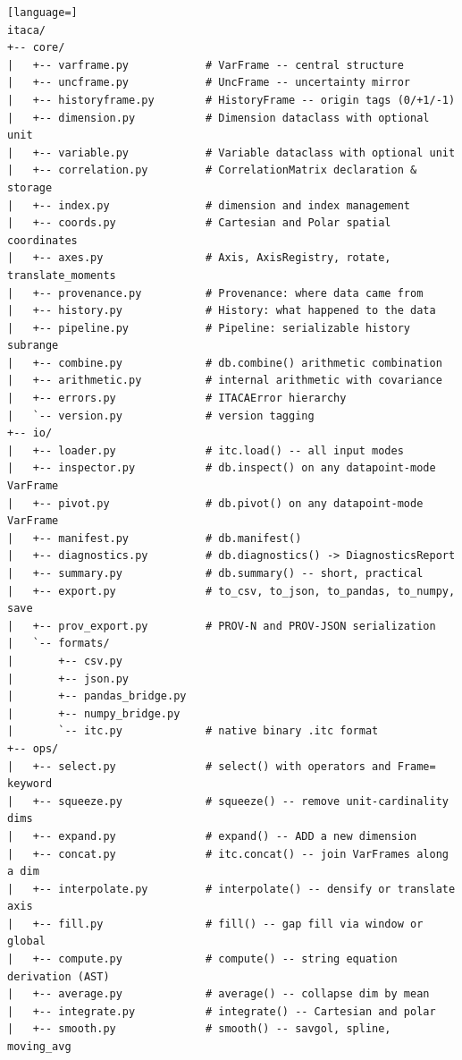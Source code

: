 \begin{lstlisting}[language=]
itaca/
+-- core/
|   +-- varframe.py            # VarFrame -- central structure
|   +-- uncframe.py            # UncFrame -- uncertainty mirror
|   +-- historyframe.py        # HistoryFrame -- origin tags (0/+1/-1)
|   +-- dimension.py           # Dimension dataclass with optional unit
|   +-- variable.py            # Variable dataclass with optional unit
|   +-- correlation.py         # CorrelationMatrix declaration & storage
|   +-- index.py               # dimension and index management
|   +-- coords.py              # Cartesian and Polar spatial coordinates
|   +-- axes.py                # Axis, AxisRegistry, rotate, translate_moments
|   +-- provenance.py          # Provenance: where data came from
|   +-- history.py             # History: what happened to the data
|   +-- pipeline.py            # Pipeline: serializable history subrange
|   +-- combine.py             # db.combine() arithmetic combination
|   +-- arithmetic.py          # internal arithmetic with covariance
|   +-- errors.py              # ITACAError hierarchy
|   `-- version.py             # version tagging
+-- io/
|   +-- loader.py              # itc.load() -- all input modes
|   +-- inspector.py           # db.inspect() on any datapoint-mode VarFrame
|   +-- pivot.py               # db.pivot() on any datapoint-mode VarFrame
|   +-- manifest.py            # db.manifest()
|   +-- diagnostics.py         # db.diagnostics() -> DiagnosticsReport
|   +-- summary.py             # db.summary() -- short, practical
|   +-- export.py              # to_csv, to_json, to_pandas, to_numpy, save
|   +-- prov_export.py         # PROV-N and PROV-JSON serialization
|   `-- formats/
|       +-- csv.py
|       +-- json.py
|       +-- pandas_bridge.py
|       +-- numpy_bridge.py
|       `-- itc.py             # native binary .itc format
+-- ops/
|   +-- select.py              # select() with operators and Frame= keyword
|   +-- squeeze.py             # squeeze() -- remove unit-cardinality dims
|   +-- expand.py              # expand() -- ADD a new dimension
|   +-- concat.py              # itc.concat() -- join VarFrames along a dim
|   +-- interpolate.py         # interpolate() -- densify or translate axis
|   +-- fill.py                # fill() -- gap fill via window or global
|   +-- compute.py             # compute() -- string equation derivation (AST)
|   +-- average.py             # average() -- collapse dim by mean
|   +-- integrate.py           # integrate() -- Cartesian and polar
|   +-- smooth.py              # smooth() -- savgol, spline, moving_avg

\end{lstlisting}
